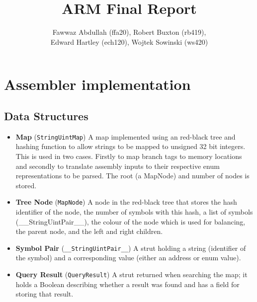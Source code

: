\documentclass[8pt]{article}
\begin{document}
\title{ARM Final Report}
\author{Fawwaz Abdullah (ffa20), Robert Buxton (rb419), \\Edward Hartley (ech120), Wojtek Sowinski (ws420) }

\maketitle

\section{Assembler implementation}

\subsection{Data Structures}

\begin{itemize}

    \item \textbf{Map} (\texttt{StringUintMap}) A map implemented using an
    red-black tree and hashing function to allow strings to be mapped to unsigned
    32 bit integers. This is used in two cases. Firstly to map branch tags to
    memory locations and secondly to translate assembly inputs to their respective
    enum representations to be parsed. The root (a MapNode) and number of nodes is stored.

    \item \textbf{Tree Node} (\texttt{MapNode}) A node in the red-black tree that
    stores the hash identifier of the node, the number of symbols with this hash,
    a list of symbols (\_\_StringUintPair\_\_), the colour of the node which is used for balancing, the
    parent node, and the left and right children.

    \item \textbf{Symbol Pair} (\texttt{\_\_StringUintPair\_\_}) A strut holding a
    string (identifier of the symbol) and a corresponding value (either an
    address or enum value).


    \item \textbf{Query Result} (\texttt{QueryResult}) A strut returned when searching the map;
    it holds a Boolean describing whether a result was found and has a field for storing that result.

\end{itemize}
\end{document}
